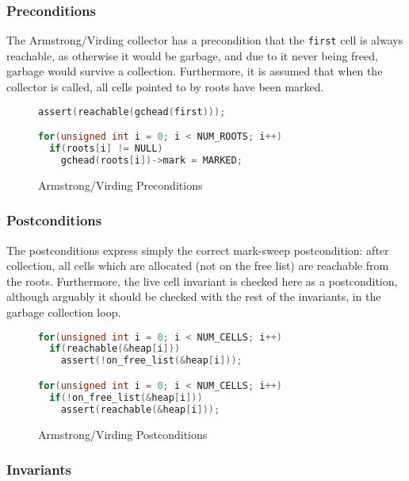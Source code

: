 \subsubsection{Preconditions}
\label{sec:results-impl-ms-pre}

The Armstrong/Virding collector has a precondition that the
\texttt{first} cell is always reachable, as otherwise it would be
garbage, and due to it never being freed, garbage would survive a
collection. Furthermore, it is assumed that when the collector is
called, all cells pointed to by roots have been marked.

\begin{figure}[H]
  \begin{lstlisting}[language=C]
assert(reachable(gchead(first)));

for(unsigned int i = 0; i < NUM_ROOTS; i++)
  if(roots[i] != NULL)
    gchead(roots[i])->mark = MARKED;
  \end{lstlisting}
  \captionsetup{format=default}
  \caption{Armstrong/Virding Preconditions}
\end{figure}

\subsubsection{Postconditions}
\label{sec:results-impl-ms-post}

The postconditions express simply the correct mark-sweep
postcondition: after collection, all cells which are allocated (not on
the free list) are reachable from the roots. Furthermore, the live
cell invariant is checked here as a postcondition, although arguably
it should be checked with the rest of the invariants, in the garbage
collection loop.

\begin{figure}[H]
  \begin{lstlisting}[language=C]
for(unsigned int i = 0; i < NUM_CELLS; i++)
  if(reachable(&heap[i]))
    assert(!on_free_list(&heap[i]));

for(unsigned int i = 0; i < NUM_CELLS; i++)
  if(!on_free_list(&heap[i]))
    assert(reachable(&heap[i]));
  \end{lstlisting}
  \captionsetup{format=default}
  \caption{Armstrong/Virding Postconditions}
\end{figure}

\subsubsection{Invariants}
\label{sec:results-impl-ms-invariants}

